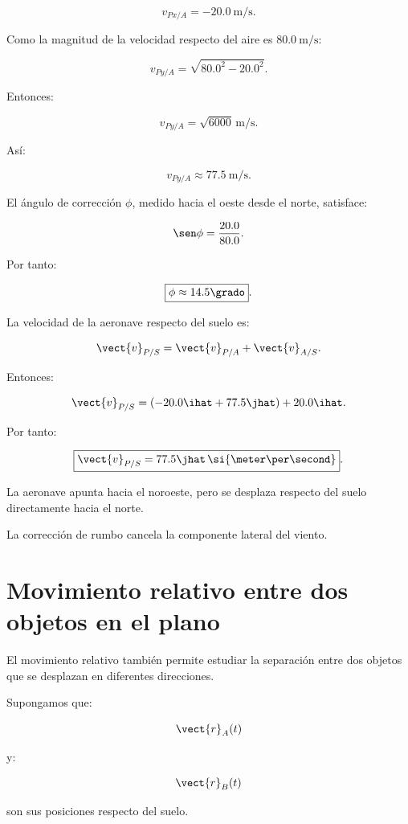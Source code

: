 \[
v_{Px/A}=-\SI{20.0}{\meter\per\second}.
\]

Como la magnitud de la velocidad
respecto del aire es \(\SI{80.0}{\meter\per\second}\):

\[
v_{Py/A}
=
\sqrt{80.0^2-20.0^2}.
\]

Entonces:

\[
v_{Py/A}
=
\sqrt{6000}\,
\si{\meter\per\second}.
\]

Así:

\[
\boxed{
v_{Py/A}\approx
\SI{77.5}{\meter\per\second}
}.
\]

El ángulo de corrección \(\phi\),
medido hacia el oeste desde el norte,
satisface:

\[
\sen\phi=\frac{20.0}{80.0}.
\]

Por tanto:

\[
\boxed{
\phi\approx14.5\grado
}.
\]

La velocidad de la aeronave respecto del suelo es:

\[
\vect{v}_{P/S}
=
\vect{v}_{P/A}+\vect{v}_{A/S}.
\]

Entonces:

\[
\vect{v}_{P/S}
=
(-20.0\ihat+77.5\jhat)
+
20.0\ihat.
\]

Por tanto:

\[
\boxed{
\vect{v}_{P/S}
=
77.5\jhat\,
\si{\meter\per\second}
}.
\]

\begin{interpretacion}

La aeronave apunta hacia el noroeste,
pero se desplaza respecto del suelo
directamente hacia el norte.

La corrección de rumbo cancela
la componente lateral del viento.

\end{interpretacion}


\section{Movimiento relativo entre dos objetos en el plano}

El movimiento relativo también permite estudiar
la separación entre dos objetos que se desplazan
en diferentes direcciones.

Supongamos que:

\[
\vect{r}_A(t)
\]

y:

\[
\vect{r}_B(t)
\]

son sus posiciones respecto del suelo.

